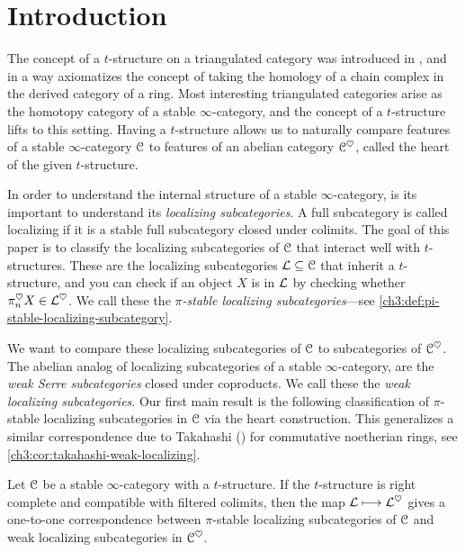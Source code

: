 

\section{Introduction}

The concept of a $t$-structure on a triangulated category was introduced in \cite{beilinson-bernstein-deligne_1983}, and in a way axiomatizes the concept of taking the homology of a chain complex in the derived category of a ring. Most interesting triangulated categories arise as the homotopy category of a stable $\infty$-category, and the concept of a $t$-structure lifts to this setting. Having a $t$-structure allows us to naturally compare features of a stable $\infty$-category $\EuScript{C}$ to features of an abelian category $\EuScript{C}^\heartsuit$, called the heart of the given $t$-structure. 

In order to understand the internal structure of a stable $\infty$-category, is its important to understand its \emph{localizing subcategories}. A full subcategory is called localizing if it is a stable full subcategory closed under colimits. The goal of this paper is to classify the localizing subcategories of $\EuScript{C}$ that interact well with $t$-structures. These are the localizing subcategories $\mathcal{L}\subseteq \EuScript{C}$ that inherit a $t$-structure, and you can check if an object $X$ is in $\mathcal{L}$ by checking whether $\pi_n^\heartsuit X\in \mathcal{L}^\heartsuit$. We call these the \emph{$\pi$-stable localizing subcategories}---see \cref{ch3:def:pi-stable-localizing-subcategory}. 

We want to compare these localizing subcategories of $\EuScript{C}$ to subcategories of $\EuScript{C}^\heartsuit$. The abelian analog of localizing subcategories of a stable $\infty$-category, are the \emph{weak Serre subcategories} closed under coproducts. We call these the \emph{weak localizing subcategories}. Our first main result is the following classification of $\pi$-stable localizing subcategories in $\EuScript{C}$ via the heart construction. This generalizes a similar correspondence due to Takahashi (\cite{takahashi_2009}) for commutative noetherian rings, see \cref{ch3:cor:takahashi-weak-localizing}. 

\begin{introthm}
    \label{ch3:thm:A}
    Let $\EuScript{C}$ be a stable $\infty$-category with a $t$-structure. If the $t$-structure is right complete and compatible with filtered colimits, then the map $\mathcal{L}\longmapsto \mathcal{L}^\heartsuit$ gives a one-to-one correspondence between $\pi$-stable localizing subcategories of $\EuScript{C}$ and weak localizing subcategories in $\EuScript{C}^\heartsuit$.
\end{introthm}

